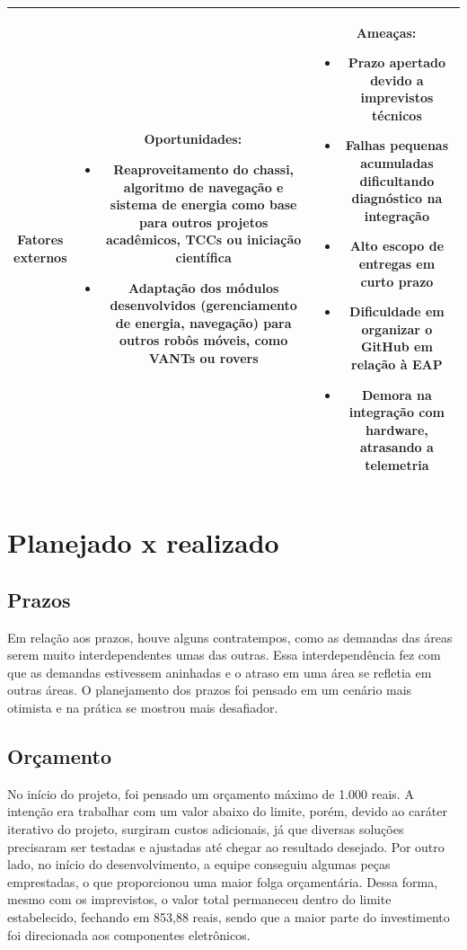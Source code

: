 \begin{table}[H]
\begin{tabular}{|c|c|c|}
{\parbox{0.1\textwidth}{ \textbf{Fatores \\ externos}}}  &
{\parbox{0.4\textwidth}{ Oportunidades:
\begin{itemize}
    \item Reaproveitamento do chassi, algoritmo de navegação e sistema de energia como base para outros projetos acadêmicos, TCCs ou iniciação científica
    \item Adaptação dos módulos desenvolvidos (gerenciamento de energia, navegação) para outros robôs móveis, como VANTs ou rovers
\end{itemize}}}
&
{\parbox{0.4\textwidth}{ Ameaças:
\begin{itemize}
    \item Prazo apertado devido a imprevistos técnicos
    \item Falhas pequenas acumuladas dificultando diagnóstico na integração
    \item Alto escopo de entregas em curto prazo
    \item Dificuldade em organizar o GitHub em relação à EAP
    \item Demora na integração com hardware, atrasando a telemetria
\end{itemize}}}
\\ \hline
\end{tabular}
\label{tab:swot}
\end{table}


\section{Planejado x realizado}

\subsection{Prazos}

Em relação aos prazos, houve alguns contratempos, como as demandas das áreas serem muito interdependentes umas das outras. Essa interdependência fez com que as demandas estivessem aninhadas e o atraso em uma área se refletia em outras áreas. O planejamento dos prazos foi pensado em um cenário mais otimista e na prática se mostrou mais desafiador. 

\subsection{Orçamento}

No início do projeto, foi pensado um orçamento máximo de 1.000 reais. A intenção era trabalhar com um valor abaixo do limite, porém, devido ao caráter iterativo do projeto, surgiram custos adicionais, já que diversas soluções precisaram ser testadas e ajustadas até chegar ao resultado desejado. Por outro lado, no início do desenvolvimento, a equipe conseguiu algumas peças emprestadas, o que proporcionou uma maior folga orçamentária. Dessa forma, mesmo com os imprevistos, o valor total permaneceu dentro do limite estabelecido, fechando em 853,88 reais, sendo que a maior parte do investimento foi direcionada aos componentes eletrônicos.

